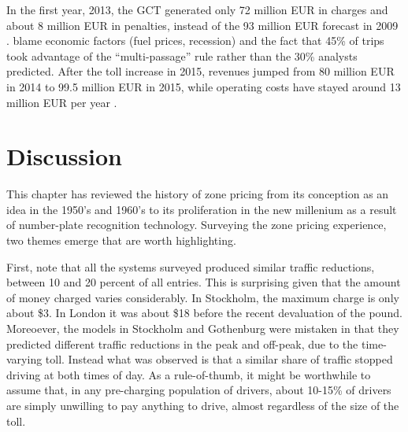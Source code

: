 In the first year, 2013, the GCT generated only 72 million EUR in charges and about 8 million EUR in penalties, instead of the 93 million EUR forecast in 2009 \citep[pp. 142-143]{Borjesson2015}. \citet{Borjesson2015} blame economic factors (fuel prices, recession) and the fact that 45\% of trips took advantage of the ``multi-passage'' rule rather than the 30\% analysts predicted. After the toll increase in 2015, revenues jumped from 80 million EUR in 2014 to 99.5 million EUR in 2015, while operating costs have stayed around 13 million EUR per year \citep[table 3]{Borjesson2018}.















\section{Discussion}\label{sec:discussion}

This chapter has reviewed the history of zone pricing from its conception as an idea in the 1950's and 1960's to its proliferation in the new millenium as a result of number-plate recognition technology. Surveying the zone pricing experience, two themes emerge that are worth highlighting.

First, note that all the systems surveyed produced similar traffic reductions, between 10 and 20 percent of all entries. This is surprising given that the amount of money charged varies considerably. In Stockholm, the maximum charge is only about \$3. In London it was about \$18 before the recent devaluation of the pound. Moreoever, the models in Stockholm and Gothenburg were mistaken in that they predicted different traffic reductions in the peak and off-peak, due to the time-varying toll. Instead what was observed is that a similar share of traffic stopped driving at both times of day. As a rule-of-thumb, it might be worthwhile to assume that, in any pre-charging population of drivers, about 10-15\% of drivers are simply unwilling to pay anything to drive, almost regardless of the size of the toll.

